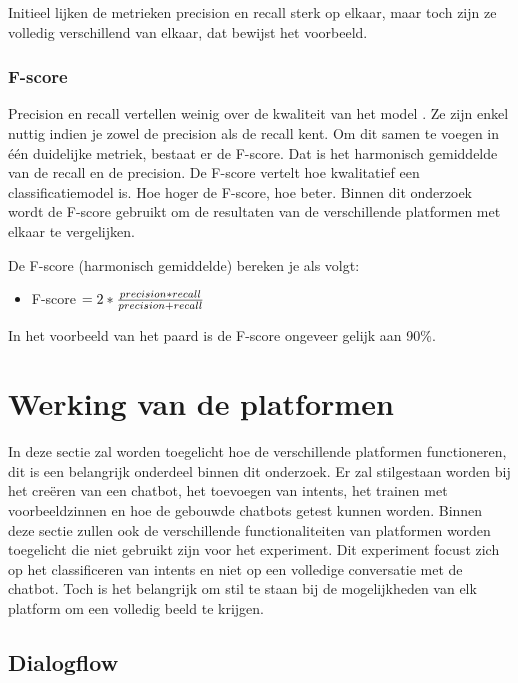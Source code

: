 Initieel lijken de metrieken precision en recall sterk op elkaar, maar toch zijn ze volledig verschillend van elkaar, dat bewijst het voorbeeld.

\subsubsection{F-score}

Precision en recall vertellen weinig over de kwaliteit van het model \autocite{Treml2019}. Ze zijn enkel nuttig indien je zowel de precision als de recall kent. Om dit samen te voegen in één duidelijke metriek, bestaat er de F-score. Dat is het harmonisch gemiddelde van de recall en de precision. De F-score vertelt hoe kwalitatief een classificatiemodel is. Hoe hoger de F-score, hoe beter. Binnen dit onderzoek wordt de F-score gebruikt om de resultaten van de verschillende platformen met elkaar te vergelijken.

De F-score (harmonisch gemiddelde) bereken je als volgt:
\begin{itemize}
    \item F-score $= 2 * \frac{precision*recall}{precision+recall}\\$
\end{itemize}

In het voorbeeld van het paard is de F-score ongeveer gelijk aan 90\%.


\section{Werking van de platformen}
\label{sec:werking-platformen}


In deze sectie zal worden toegelicht hoe de verschillende platformen functioneren, dit is een belangrijk onderdeel binnen dit onderzoek. Er zal stilgestaan worden bij het creëren van een chatbot, het toevoegen van intents, het trainen met voorbeeldzinnen en hoe de gebouwde chatbots getest kunnen worden. Binnen deze sectie zullen ook de verschillende functionaliteiten van platformen worden toegelicht die niet gebruikt zijn voor het experiment. Dit experiment focust zich op het classificeren van intents en niet op een volledige conversatie met de chatbot. Toch is het belangrijk om stil te staan bij de mogelijkheden van elk platform om een volledig beeld te krijgen.

\subsection{Dialogflow}
\label{subsec:werking-platformen-dialogflow}

